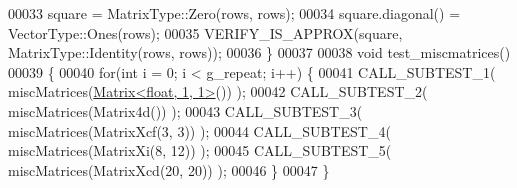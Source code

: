 \begin{DoxyCode}
00033   square = MatrixType::Zero(rows, rows);
00034   square.diagonal() = VectorType::Ones(rows);
00035   VERIFY\_IS\_APPROX(square, MatrixType::Identity(rows, rows));
00036 \}
00037 
00038 \textcolor{keywordtype}{void} test\_miscmatrices()
00039 \{
00040   \textcolor{keywordflow}{for}(\textcolor{keywordtype}{int} i = 0; i < g\_repeat; i++) \{
00041     CALL\_SUBTEST\_1( miscMatrices(\hyperlink{group___core___module_class_eigen_1_1_matrix}{Matrix<float, 1, 1>}()) );
00042     CALL\_SUBTEST\_2( miscMatrices(Matrix4d()) );
00043     CALL\_SUBTEST\_3( miscMatrices(MatrixXcf(3, 3)) );
00044     CALL\_SUBTEST\_4( miscMatrices(MatrixXi(8, 12)) );
00045     CALL\_SUBTEST\_5( miscMatrices(MatrixXcd(20, 20)) );
00046   \}
00047 \}
\end{DoxyCode}
